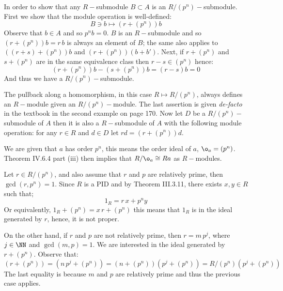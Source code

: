 In order to show that any $R-$submodule $B\subset A$ is an $R/(p^n)-$submodule. 
First we show that the module operation is well-defined:
$$B\ni b \mapsto (r+(p^n))b$$
Observe that  $b\in A$ and so $p^nb=0$. $B$  is an $R-$submodule and so $(r+(p^n) )b = r\, b$ is  always an element of $B$; the same  also applies to   $((r+s)+(p^n))b$ and $(r+(p^n) )(b+b')$.
Next, if $r+(p^n)$ and $s+(p^n) $ are in the same equivalence class then $r-s\in (p^n)$ hence:
$$(r+(p^n))b -  (s+(p^n))b= (r-s)b=0$$
And thus we have a $R/(p^n)-$submodule.

The pullback along a homomorphism, in this case $R\mapsto R/(p^n)$, always defines an $R-$module given an $R/(p^n)-$module.
The last assertion is given \textit{de-facto} in the textbook in the second example on page 170.
Now let $D$ be a $R/(p^n)-$submodule of $A$ then it is also a $R-$submodule of $A$ with the following module operation:
for any $r\in R$ and $d\in D$ let $rd= (r+(p^n))d$.

We are given that $a$ has order $p^n$, this means the order ideal of $a$, $\o_a=(p^n)$. 
Theorem IV.6.4 part (iii) then implies that $R/\o_a \cong Ra$ as $R-$modules.

Let $r\in R/(p^n)$, and also assume that $r$ and $p$ are relatively prime, then $\gcd(r,p^n)=1$. 
Since $R$ is a PID and by Theorem III.3.11, there exists $x,y\in R$ such that;
$$1_R = r\,x + p^ny$$
Or equivalently, $1_R + (p^n) = x\,r + (p^n)$ this means that $1_R$ is in the ideal generated by $r$, hence,  it is not proper.

On the other hand, if $r$ and $p$ are not relatively prime, then $r=m\, p^j$, where $j\in \NN$ and $\gcd(m,p)=1$.
We are interested in the ideal generated by $r+(p^n)$. Observe that:
$$(r+(p^n)) = (n\,p^j+(p^n))= (n+(p^n))(p^j+(p^n))=R/(p^n)(p^j+(p^n))$$
The last equality is because $m$ and $p$ are relatively prime and thus the previous case applies.


